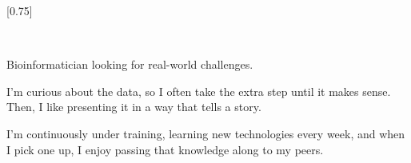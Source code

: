 \documentclass[verylight]{simplehipstercv}
\begin{document}
\setlength{\columnsep}{1.5cm}
[0.75]
\begin{paracol}{2}
\flushright
\paracolbackgroundoptions


\footnotesize
{\setasidefontcolour
\flushright
\begin{center}
\end{center}

\vspace{1em}



\vspace{1em}

\vspace{1em}

\setlength{\parindent}{0pt}
\vspace{1em}

\setlength{\parindent}{0pt}
\vspace{1em}

\\[0.5em]
\vspace{0.5em}

Bioinformatician looking for real-world challenges. 

I'm curious about the data, so I often take the extra step until it makes sense. Then, I like presenting it in a way that tells a story. 
\vspace{2em}

I'm continuously under training, learning new technologies every week, and when I pick one up, I enjoy passing that knowledge along to my peers. 



\bigskip


 \\[0.5em]
\vspace{0.5em}

}
\end{paracol}
\end{document}
